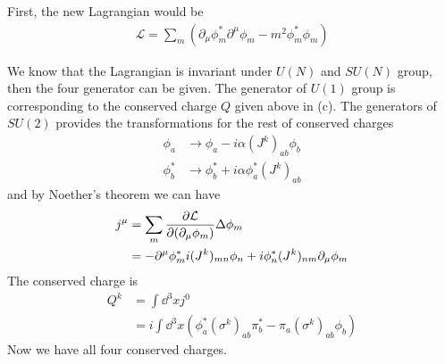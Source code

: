 \documentclass{article}
\newcommand{\lag}{\mathcal{L}}
\begin{document}
First, the new Lagrangian would be
\begin{align}
  \lag=\sum\limits_m(\partial_{\mu}\phi^*_m\partial^{\mu}\phi_m-m^2\phi^*_m\phi_m)
\end{align}


We know that the Lagrangian is invariant under $U(N)$ and $SU(N)$ group, then the four generator can be given. The generator of $U(1)$ group is corresponding to the conserved charge $Q$ given above in (c). The generators of $SU(2)$ provides the transformations for the rest of conserved charges
\begin{align*}
  \phi_a&\rightarrow \phi_a-i\alpha (J^k)_{ab}\phi_b\\
  \phi_b^*&\rightarrow\phi_b^*+i\alpha\phi_a^*(J^k)_{ab}
\end{align*}
and by Noether's theorem we can have
\begin{align*}
  j^{\mu}&=\sum\limits_m\pdv{\lag}{(\partial_{\mu}\phi_m)}\Delta\phi_m\\
  &=-\partial^{\mu}\phi^*_mi (J^k)_{mn}\phi_n+ i\phi_n^*(J^k)_{nm}\partial_{\mu}\phi_m
\end{align*}
The conserved charge is
\begin{align*}
  Q^k&=\int\dd^3xj^0\\
  &=i\int\dd^3x(\phi_a^*(\sigma^k)_{ab}\pi^*_b-\pi_a  (\sigma^k)_{ab}\phi_b)
\end{align*}
Now we have all four conserved charges.
\end{document}
